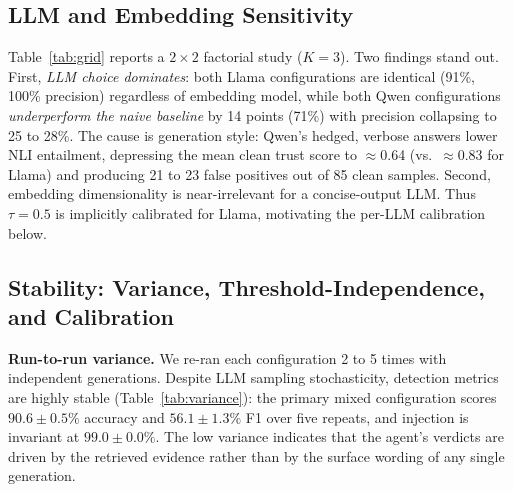 \subsection{LLM and Embedding Sensitivity}
\label{sec:grid}
Table~\ref{tab:grid} reports a $2\times2$ factorial study ($K{=}3$). Two findings stand out. First, \emph{LLM choice dominates}: both Llama configurations are identical (91\%, 100\% precision) regardless of embedding model, while both Qwen configurations \emph{underperform the naive baseline} by 14 points (71\%) with precision collapsing to 25 to 28\%. The cause is generation style: Qwen's hedged, verbose answers lower NLI entailment, depressing the mean clean trust score to $\approx$0.64 (vs.\ $\approx$0.83 for Llama) and producing 21 to 23 false positives out of 85 clean samples. Second, embedding dimensionality is near-irrelevant for a concise-output LLM. Thus $\tau{=}0.5$ is implicitly calibrated for Llama, motivating the per-LLM calibration below.

\begin{table}[t]
\caption{$2\times2$ LLM\,$\times$\,embedding grid (TruthfulQA, 100 samples,
mixed, $K{=}3$).}
\label{tab:grid}
\centering {}
\end{table}

\subsection{Stability: Variance, Threshold-Independence, and Calibration}
\label{sec:stability}


\textbf{Run-to-run variance.} We re-ran each configuration 2 to 5 times with independent generations. Despite LLM sampling stochasticity, detection metrics are highly stable (Table~\ref{tab:variance}): the primary mixed configuration scores $90.6{\pm}0.5\%$ accuracy and $56.1{\pm}1.3\%$ F1 over five repeats, and injection is invariant at $99.0{\pm}0.0\%$. The low variance indicates that the agent's verdicts are driven by the retrieved evidence rather than by the surface wording of any single generation.


